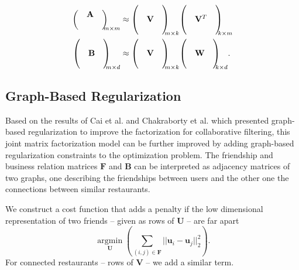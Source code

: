 \documentclass[a4paper]{article}
\begin{document}
\begin{align}
{\begin{pmatrix}
  & \mathbf{A} &\\
  &     &
\end{pmatrix}
\mkern-10mu}_{m \times m} &\approx
{\begin{pmatrix}
  &    & \\
  & \mathbf{V} &\\
  &     &
\end{pmatrix}
\mkern-10mu}_{m \times k}
{\begin{pmatrix}
  &    & \\
  & \mathbf{V}^T &\\
  &     &
\end{pmatrix}\mkern-10mu}_{k \times m} \\
{\begin{pmatrix}
  &    & \\
  & \mathbf{B} &\\
  &     &
\end{pmatrix}
\mkern-10mu}_{m \times d} &\approx
{\begin{pmatrix}
  &    & \\
  & \mathbf{V} &\\
  &     &
\end{pmatrix}
\mkern-10mu}_{m \times k}
{\begin{pmatrix}
  &    & \\
  & \mathbf{W} &\\
  &     &
\end{pmatrix}\mkern-10mu}_{k \times d}  .
\end{align}

\subsection{Graph-Based Regularization}
Based on the results of Cai et al.\cite{cai2011graph} and Chakraborty et al.\cite{chakraborty2015nonnegative} which presented graph-based regularization to improve the factorization for collaborative filtering, this joint matrix factorization model can be further improved by adding graph-based regularization constraints to the optimization problem. The friendship and business relation matrices $\mathbf{F}$ and $\mathbf{B}$ can be interpreted as adjacency matrices of two graphs, one describing the friendships between users and the other one the connections between similar restaurants.

We construct a cost function that adds a penalty if the low dimensional representation of two friends -- given as rows of $\mathbf{U}$ -- are far apart
\begin{equation}
\underset{\mathbf{U}}{\operatorname{argmin}} \left(\sum_{(i,j) \in \mathbf{F}}||\mathbf{u}_i - \mathbf{u}_j||_2^2 \right).
\end{equation}
For connected restaurants -- rows of $\mathbf{V}$ -- we add a similar term. 
\end{document}
